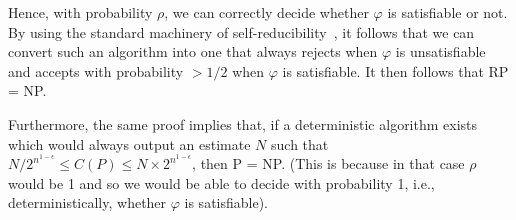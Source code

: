 Hence, with probability $\rho$, we can correctly decide whether $\varphi$ is satisfiable or not. By using the standard machinery of self-reducibility~\cite{aroraBarak}, it follows
that we can convert such an algorithm into one that always rejects when $\varphi$ is unsatisfiable and accepts with probability $> 1/2$ when $\varphi$ is satisfiable.
It then follows that RP = NP. 

Furthermore, the same proof implies that, if a deterministic algorithm exists
which would always output an estimate $N$ such that $N/2^{n^{1-\epsilon}} \le C(P) \le N \times 2^{n^{1-\epsilon}}$, then P = NP. (This is because in that case $\rho$ would be 1 and so we would be able to decide with probability 1, i.e., deterministically, whether
$\varphi$ is satisfiable).







